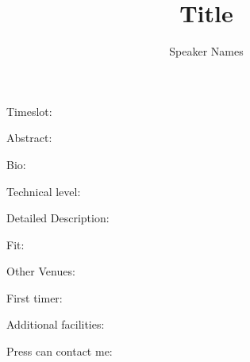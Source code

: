 \documentclass[12pt]{article}
\title{Title}
\author{Speaker Names}
\begin{document}
\maketitle

Timeslot:

Abstract: 

Bio:

Technical level:

Detailed Description: 

Fit: 

Other Venues: 

First timer: 

Additional facilities: 

Press can contact me:
\end{document}
